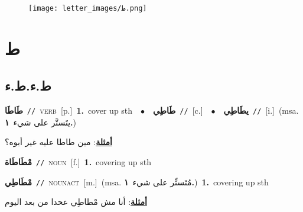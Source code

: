 \documentclass[10pt,a4paper,twoside]{article} %
\begin{document}
\begin{figure*}[t!]\centering\texttt{[image: letter\_images/ط.png]}\end{figure*}
\color{white}

 \section*{\foreignlanguage{arabic}{ط}} 
 \begin{multicols}{2} 

%
\color{black}
\vspace{-3mm}
\subsection*{\color{blue}\foreignlanguage{arabic}{ط.ء.ط.ء}\color{blue}{}} 

{\setlength\topsep{0pt}\textbf{\foreignlanguage{arabic}{طَاطَا}}\ {\color{gray}\texttt{//}\color{black}}\ \textsc{verb}\ [p.]\ \textbf{1.}~cover up sth\ \ $\bullet$\ \ \setlength\topsep{0pt}\textbf{\foreignlanguage{arabic}{طَاطِي}}\ {\color{gray}\texttt{//}\color{black}}\ [c.]\ \ $\bullet$\ \ \setlength\topsep{0pt}\textbf{\foreignlanguage{arabic}{يطَاطِي}}\ {\color{gray}\texttt{//}\color{black}}\ [i.]\ \color{gray}(msa. \foreignlanguage{arabic}{يتَستَّر على شيء}~\foreignlanguage{arabic}{\textbf{١.}})\color{black}\  \begin{flushright}\color{gray}\foreignlanguage{arabic}{\textbf{\underline{\foreignlanguage{arabic}{أمثلة}}}: مين طاطا عليه غير أبوه؟}\end{flushright}\color{black}} \vspace{2mm}

{\setlength\topsep{0pt}\textbf{\foreignlanguage{arabic}{مْطَاطَاة}}\ {\color{gray}\texttt{//}\color{black}}\ \textsc{noun}\ [f.]\ \textbf{1.}~covering up sth\ } \vspace{2mm}

{\setlength\topsep{0pt}\textbf{\foreignlanguage{arabic}{مْطَاطِي}}\ {\color{gray}\texttt{//}\color{black}}\ \textsc{noun\textunderscore act}\ [m.]\ \color{gray}(msa. \foreignlanguage{arabic}{مُتَستِّر على شيء}~\foreignlanguage{arabic}{\textbf{١.}})\color{black}\ \textbf{1.}~covering up sth\  \begin{flushright}\color{gray}\foreignlanguage{arabic}{\textbf{\underline{\foreignlanguage{arabic}{أمثلة}}}: أنا مش مْطاطِي عحدا من بعد اليوم}\end{flushright}\color{black}} \vspace{2mm}


\end{multicols}
\end{document}
